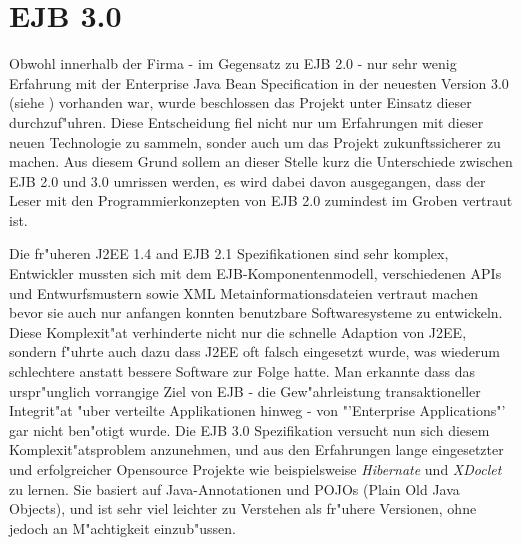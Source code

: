 \section{EJB 3.0}
\label{sec:chap2:ejb3}

Obwohl innerhalb der Firma - im Gegensatz zu EJB 2.0 - nur sehr wenig Erfahrung mit der Enterprise Java Bean Specification in der
neuesten Version 3.0 (siehe \cite{EJBHP}) vorhanden war, wurde beschlossen das Projekt unter Einsatz dieser durchzuf"uhren. 
Diese Entscheidung fiel nicht nur um Erfahrungen mit dieser neuen Technologie zu sammeln, sonder auch um das Projekt zukunftssicherer 
zu machen.
Aus diesem Grund sollem an dieser Stelle kurz die Unterschiede zwischen EJB 2.0 und 3.0 umrissen werden, es wird dabei
davon ausgegangen, dass der Leser mit den Programmierkonzepten von EJB 2.0 zumindest im Groben vertraut ist.

Die fr"uheren J2EE 1.4 and EJB 2.1 Spezifikationen sind sehr komplex, Entwickler mussten sich mit dem EJB-Komponentenmodell,
verschiedenen APIs und Entwurfsmustern sowie XML Metainformationsdateien vertraut machen bevor sie auch nur anfangen konnten
benutzbare Softwaresysteme zu entwickeln. Diese Komplexit"at verhinderte nicht nur die schnelle Adaption von J2EE,
sondern f"uhrte auch dazu dass J2EE oft falsch eingesetzt wurde, was wiederum schlechtere anstatt bessere Software zur Folge hatte.
Man erkannte dass das urspr"unglich vorrangige Ziel von EJB - die Gew"ahrleistung transaktioneller Integrit"at "uber verteilte 
Applikationen hinweg - von "'Enterprise Applications"' gar nicht ben"otigt wurde.
Die EJB 3.0 Spezifikation versucht nun sich diesem Komplexit"atsproblem anzunehmen, und aus den Erfahrungen lange eingesetzter
und erfolgreicher Opensource Projekte wie beispielsweise \emph{Hibernate} \cite{HIBERNATEHP} und \emph{XDoclet} \cite{XDOCLETHP}
zu lernen. Sie basiert auf Java-Annotationen und POJOs (Plain Old Java Objects), und ist sehr viel leichter zu Verstehen als
fr"uhere Versionen, ohne jedoch an M"achtigkeit einzub"ussen.

